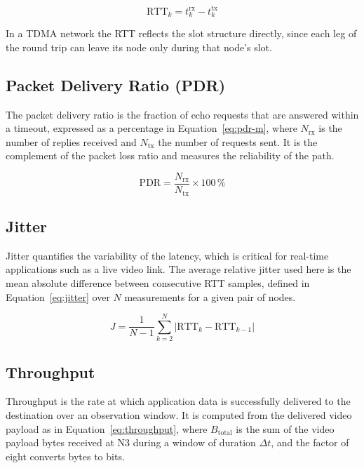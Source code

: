 \begin{equation}
\mathrm{RTT}_k = t^{\mathrm{rx}}_k - t^{\mathrm{tx}}_k
\label{eq:rtt}
\end{equation}

In a TDMA network the RTT reflects the slot structure directly, since each leg
of the round trip can leave its node only during that node's slot.

\subsection{Packet Delivery Ratio (PDR)}
\label{subsec:m-pdr}

The packet delivery ratio is the fraction of echo requests that are answered
within a timeout, expressed as a percentage in Equation~\ref{eq:pdr-m}, where
$N_{\mathrm{rx}}$ is the number of replies received and $N_{\mathrm{tx}}$ the
number of requests sent. It is the complement of the packet loss ratio and
measures the reliability of the path.

\begin{equation}
\mathrm{PDR} = \frac{N_{\mathrm{rx}}}{N_{\mathrm{tx}}} \times 100\,\%
\label{eq:pdr-m}
\end{equation}

\subsection{Jitter}
\label{subsec:m-jitter}

Jitter quantifies the variability of the latency, which is critical for
real-time applications such as a live video link. The average relative jitter
used here is the mean absolute difference between consecutive RTT samples,
defined in Equation~\ref{eq:jitter} over $N$ measurements for a given pair of
nodes.

\begin{equation}
J = \frac{1}{N-1}\sum_{k=2}^{N}\bigl\lvert \mathrm{RTT}_k - \mathrm{RTT}_{k-1}\bigr\rvert
\label{eq:jitter}
\end{equation}

\subsection{Throughput}
\label{subsec:m-throughput}

Throughput is the rate at which application data is successfully delivered to
the destination over an observation window. It is computed from the delivered
video payload as in Equation~\ref{eq:throughput}, where $B_{\mathrm{total}}$ is
the sum of the video payload bytes received at N3 during a window of duration
$\Delta t$, and the factor of eight converts bytes to bits.

